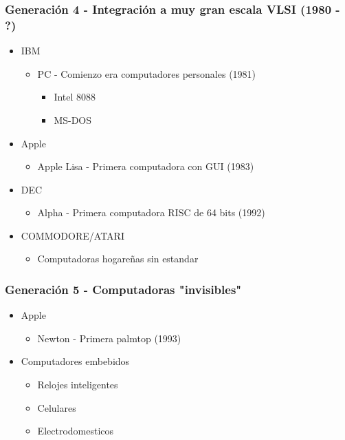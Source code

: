 \subsubsection{Generación 4 - Integración a muy gran escala VLSI (1980 - ?)}
\begin{itemize}
\item IBM
	\begin{itemize}
	\item PC - Comienzo era computadores personales (1981)
		\begin{itemize}
		\item Intel 8088
		\item MS-DOS
		\end{itemize}
	\end{itemize}
\item Apple
	\begin{itemize}
	\item Apple Lisa - Primera computadora con GUI (1983)
	\end{itemize}
\item DEC
	\begin{itemize}
	\item Alpha - Primera computadora RISC de 64 bits (1992)
	\end{itemize}	
\item COMMODORE/ATARI
	\begin{itemize}
	\item Computadoras hogareñas sin estandar
	\end{itemize}	
\end{itemize}

\subsubsection{Generación 5 - Computadoras "invisibles"}
\begin{itemize}
\item Apple
	\begin{itemize}
	\item Newton - Primera palmtop (1993)
	\end{itemize}
\item Computadores embebidos
	\begin{itemize}
	\item Relojes inteligentes
	\item Celulares
	\item Electrodomesticos
	\end{itemize}
\end{itemize}








